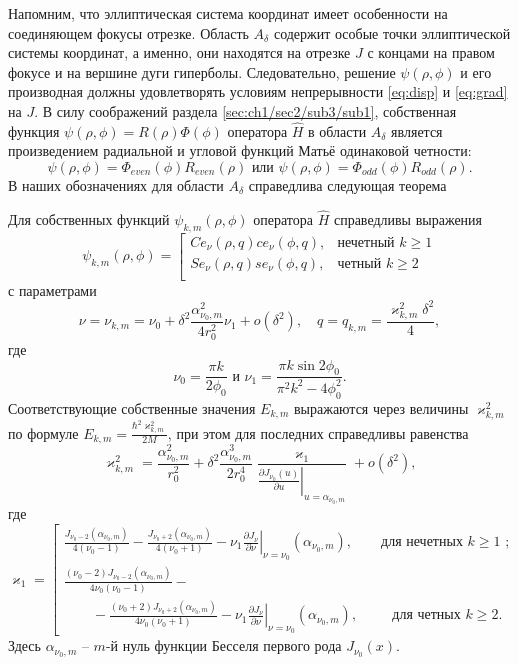 Напомним, что эллиптическая система координат имеет особенности на соединяющем фокусы отрезке. Область $A_\delta$ содержит особые точки эллиптической системы координат, а именно, они находятся на отрезке $J$ с концами на правом фокусе и на вершине дуги гиперболы.
Следовательно, решение $\psi(\rho, \phi)$ и его производная должны удовлетворять условиям непрерывности \eqref{eq:disp} и \eqref{eq:grad} на  $J$.
В силу соображений раздела \ref{sec:ch1/sec2/sub3/sub1}, собственная функция  $\psi(\rho,\phi)=R(\rho) \Phi(\phi)$ оператора $\hat{H}$ в области $A_\delta$ является произведением радиальной и угловой функций Матьё одинаковой четности:
$$ \psi(\rho,\phi) = \Phi_{even}(\phi) R_{even}(\rho)  
\text{ или }
 \psi(\rho,\phi) = \Phi_{odd}(\phi) R_{odd}(\rho) .  $$
В наших обозначениях для области $A_\delta$ справедлива следующая теорема
\begin{theorem}
Для собственных функций $\psi_{k, m}(\rho, \phi)$ оператора   $\hat{H}$ справедливы выражения
\begin{equation}
\psi_{k, m}(\rho, \phi) = 
\left[
\begin{array}{ll}
    Ce_\nu(\rho, q) ce_\nu(\phi, q) ,   &    \text{нечетный $k \geq 1$}\\
    Se_\nu(\rho, q) se_\nu(\phi, q) ,   &    \text{четный $k \geq 2$}\\
\end{array}
\right.\label{eq:fun}
\end{equation}
с параметрами
\[
\nu = \nu_{k,m} = \nu_0+ \delta^2 \frac{\alpha_{\nu_0, m}^2}{4 r_0^2}  \nu_1 + o(\delta^2),  \quad q=q_{k,m} = \dfrac{\varkappa_{k,m}^2 \delta^2}{4},
\]
где
$$\nu_0 = \frac{\pi k}{2\phi_0}\text{\ \  и\  \  }\nu_1=\frac{\pi k \sin 2\phi_0}{\pi^2 k^2 - 4\phi_0^2}  .$$
Соответствующие собственные значения $E_{k, m}$ выражаются через величины $\varkappa^2_{k, m}$ по формуле $E_{k, m} =  \frac{\hbar^2 \varkappa^2_{k, m}}{2M}$, при этом для последних  справедливы равенства
\begin{equation}
\varkappa^2_{k, m} = \dfrac{\alpha_{\nu_0, m}^2}{r_0^2} +
\delta^2 \dfrac{\alpha_{\nu_0, m}^3}{2 r_0^4}\dfrac{\varkappa_1 }{ \left.\frac{\partial J_{\nu_0}(u)}{\partial u}\right|_{u=\alpha_{\nu_0, m}} } + o(\delta^2),\label{eq:val}
\end{equation}
где
\begin{equation*}
    \varkappa_1 = 
    \left[
\begin{array}{ll}
\frac{J_{\nu_0-2}(\alpha_{\nu_0, m})}{4(\nu_0-1)} - \frac{J_{\nu_0+2}(\alpha_{\nu_0, m})}{4(\nu_0+1)} 
  - \nu_1 \left.\frac{\partial J_\nu}{\partial \nu}\right|_{\nu=\nu_0}(\alpha_{\nu_0, m}),\qquad \text{для нечетных $k\geq 1$ ;} \\[10pt]
\frac{(\nu_0 - 2)J_{\nu_0-2}(\alpha_{\nu_0, m})   }{4\nu_0 (\nu_0-1)} -\\
\qquad - \frac{(\nu_0 + 2)J_{\nu_0+2}(\alpha_{\nu_0, m})}{4\nu_0 (\nu_0+1)}  
- \nu_1 \left.\frac{\partial J_\nu}{\partial \nu}\right|_{\nu = \nu_0}(\alpha_{\nu_0, m}), \qquad \ \ \!    \text{для четных $k \geq 2$}.        
\end{array}
\right.
\end{equation*}
Здесь $\alpha_{\nu_0,m}$ --  $m$-й нуль функции Бесселя первого рода $J_{\nu_0}(x)$.


\end{theorem}
